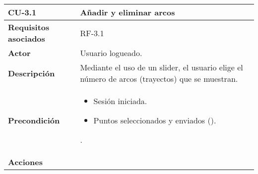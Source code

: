\begin{longtable}[H]{@{}l|l@{}}
	\toprule
	\begin{minipage}[b]{0.23\columnwidth}\raggedright\strut
		\textbf{CU-3.1}\strut
	\end{minipage} & \begin{minipage}[b]{0.71\columnwidth}\raggedright\strut
		\textbf{Añadir y eliminar arcos}\strut
	\end{minipage}\tabularnewline
	\toprule
	\endhead
	\begin{minipage}[t]{0.23\columnwidth}\raggedright\strut
		\textbf{Requisitos asociados}\strut
	\end{minipage} & \begin{minipage}[t]{0.71\columnwidth}\raggedright\strut
		RF-3.1\strut
	\end{minipage}\tabularnewline
	\midrule
	\begin{minipage}[t]{0.23\columnwidth}\raggedright\strut
		\textbf{Actor}\strut
	\end{minipage} & \begin{minipage}[t]{0.71\columnwidth}\raggedright\strut
		Usuario logueado.\strut
	\end{minipage}\tabularnewline
	\midrule
	\begin{minipage}[t]{0.23\columnwidth}\raggedright\strut
		\textbf{Descripción}\strut
	\end{minipage} & \begin{minipage}[t]{0.71\columnwidth}\raggedright\strut
		Mediante el uso de un slider, el usuario elige el número de arcos (trayectos) que se muestran.\strut
	\end{minipage}\tabularnewline
	\midrule
	\begin{minipage}[t]{0.23\columnwidth}\raggedright\strut
		\textbf{Precondición}\strut
	\end{minipage} & \begin{minipage}[t]{0.71\columnwidth}\raggedright
		\begin{itemize}
			\item Sesión iniciada.
			\item Puntos seleccionados y enviados (\nameref{cu:2}).
		\end{itemize}.
	\end{minipage}\tabularnewline
	\midrule
	\begin{minipage}[t]{0.23\columnwidth}\raggedright\strut
		\textbf{Acciones}\strut
	\end{minipage} & \begin{minipage}[t]{0.71\columnwidth}\raggedright

\end{minipage}
\end{longtable}
